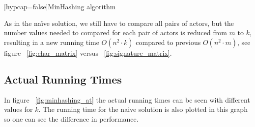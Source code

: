 \documentclass[a4paper,11pt]{article}
\makeatletter
\def\BState{\State\hskip-\ALG@thistlm}
\makeatother
\begin{document}
\begin{center}   
    [hypcap=false]{MinHashing algorithm}\label{alg:minhashing}
\end{center}

As in the naïve solution, we still have to compare all pairs of actors, but the number values needed to compared for each pair of actors is reduced from $m$ to $k$, resulting in a new running time $O(n^2 \cdot k)$ compared to previous $O(n^2 \cdot m)$, see figure ~\ref{fig:char_matrix} versus ~\ref{fig:signature_matrix}.

\subsection{Actual Running Times}
In figure ~\ref{fig:minhashing_at} the actual running times can be seen with different values for $k$. The running time for the naive solution is also plotted in this graph so one can see the difference in performance. \\
\end{document}
